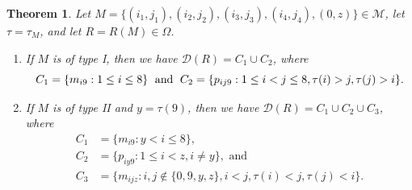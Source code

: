 \documentclass[10pt,a4paper]{amsart}
\newtheorem{theorem}{Theorem}[section]
\numberwithin{equation}{section}
\newcommand{\res}{\mathscr{D}}
\newcommand{\calm}{\mathcal{M}}
\newcommand{\ob}{\Omega}
\begin{document}
\begin{theorem}
\label{thm:mob_res}
Let $M=\{(i_1,j_1), (i_2,j_2), (i_3,j_3), (i_4,
j_4),(0,z)\}\in \calm$, let $\tau=\tau_M$, and let $R=R(M)\in \ob$.
\begin{enumerate}
\item If $M$ is of type I, then  we have
$\res(R)=C_1 \cup C_2$,
where 
  \[
    C_1=\{m_{i9}: 1\le i\le 8\} \text{\; and\; } C_2=  \{p_{ij9}: 1\le i<j\le 8,
    \tau(i)>j, \tau(j)>i\}. 
  \]
\item If $M$ is of type II and $y=\tau(9)$, then we have $\res(R)=C_1\cup
  C_2\cup C_3$,  where
  \begin{align*} 
  C_1&=\{m_{i9}: y<i\le 8\},\\
  C_2&=\{p_{iy9}: 1\le i<z, i\neq y\},\text{ and}\\
  C_3&=\{m_{ijz}: i, j\notin \{0,9,y,z\}, i<j, \tau(i)<j,\tau(j)<i\}. 
  \end{align*}
\end{enumerate}
\end{theorem}
\end{document}
